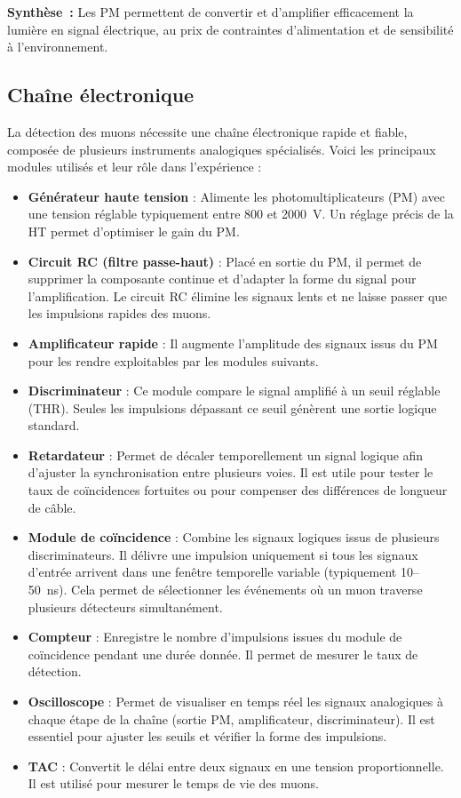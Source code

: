 \documentclass[a4paper,12pt,twoside]{article}
\begin{document}
\begin{remarque}
\textbf{Synthèse~:} Les PM permettent de convertir et d’amplifier efficacement la lumière en signal électrique, au prix de contraintes d’alimentation et de sensibilité à l’environnement.
\end{remarque}

\subsection{Chaîne électronique}


La détection des muons nécessite une chaîne électronique rapide et fiable, composée de plusieurs instruments analogiques spécialisés. Voici les principaux modules utilisés et leur rôle dans l’expérience :

\begin{itemize}
  \item \textbf{Générateur haute tension} : Alimente les photomultiplicateurs (PM) avec une tension réglable typiquement entre 800 et 2000~V. Un réglage précis de la HT permet d’optimiser le gain du PM.
  \item \textbf{Circuit RC (filtre passe-haut)} : Placé en sortie du PM, il permet de supprimer la composante continue et d’adapter la forme du signal pour l’amplification. Le circuit RC élimine les signaux lents et ne laisse passer que les impulsions rapides des muons.
  \item \textbf{Amplificateur rapide} : Il augmente l’amplitude des signaux issus du PM pour les rendre exploitables par les modules suivants.
  \item \textbf{Discriminateur} : Ce module compare le signal amplifié à un seuil réglable (THR). Seules les impulsions dépassant ce seuil génèrent une sortie logique standard.
  \item \textbf{Retardateur} : Permet de décaler temporellement un signal logique afin d’ajuster la synchronisation entre plusieurs voies. Il est utile pour tester le taux de coïncidences fortuites ou pour compenser des différences de longueur de câble.
  \item \textbf{Module de coïncidence} : Combine les signaux logiques issus de plusieurs discriminateurs. Il délivre une impulsion uniquement si tous les signaux d’entrée arrivent dans une fenêtre temporelle variable (typiquement 10–50~ns). Cela permet de sélectionner les événements où un muon traverse plusieurs détecteurs simultanément.
  \item \textbf{Compteur} : Enregistre le nombre d’impulsions issues du module de coïncidence pendant une durée donnée. Il permet de mesurer le taux de détection.
  \item \textbf{Oscilloscope} : Permet de visualiser en temps réel les signaux analogiques à chaque étape de la chaîne (sortie PM, amplificateur, discriminateur). Il est essentiel pour ajuster les seuils et vérifier la forme des impulsions.
  \item \textbf{TAC} : Convertit le délai entre deux signaux en une tension proportionnelle. Il est utilisé pour mesurer le temps de vie des muons.
\end{itemize}
\end{document}
